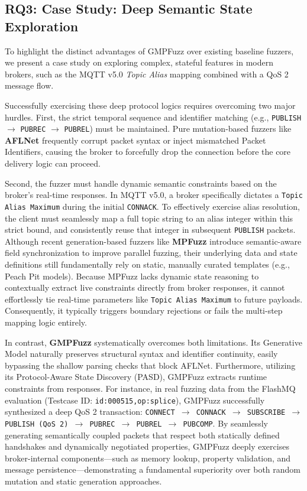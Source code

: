 \subsection{RQ3: Case Study: Deep Semantic State Exploration}
To highlight the distinct advantages of GMPFuzz over existing baseline fuzzers, we present a case study on exploring complex, stateful features in modern brokers, such as the MQTT v5.0 \textit{Topic Alias} mapping combined with a QoS 2 message flow.

Successfully exercising these deep protocol logics requires overcoming two major hurdles. First, the strict temporal sequence and identifier matching (e.g., \texttt{PUBLISH} $\rightarrow$ \texttt{PUBREC} $\rightarrow$ \texttt{PUBREL}) must be maintained. Pure mutation-based fuzzers like \textbf{AFLNet} frequently corrupt packet syntax or inject mismatched Packet Identifiers, causing the broker to forcefully drop the connection before the core delivery logic can proceed. 

Second, the fuzzer must handle dynamic semantic constraints based on the broker's real-time responses. In MQTT v5.0, a broker specifically dictates a \texttt{Topic Alias Maximum} during the initial \texttt{CONNACK}. To effectively exercise alias resolution, the client must seamlessly map a full topic string to an alias integer within this strict bound, and consistently reuse that integer in subsequent \texttt{PUBLISH} packets. Although recent generation-based fuzzers like \textbf{MPFuzz} introduce semantic-aware field synchronization to improve parallel fuzzing, their underlying data and state definitions still fundamentally rely on static, manually curated templates (e.g., Peach Pit models). Because MPFuzz lacks dynamic state reasoning to contextually extract live constraints directly from broker responses, it cannot effortlessly tie real-time parameters like \texttt{Topic Alias Maximum} to future payloads. Consequently, it typically triggers boundary rejections or fails the multi-step mapping logic entirely.

In contrast, \textbf{GMPFuzz} systematically overcomes both limitations. Its Generative Model naturally preserves structural syntax and identifier continuity, easily bypassing the shallow parsing checks that block AFLNet. Furthermore, utilizing its Protocol-Aware State Discovery (PASD), GMPFuzz extracts runtime constraints from responses. For instance, in real fuzzing data from the FlashMQ evaluation (Testcase ID: \texttt{id:000515,op:splice}), GMPFuzz successfully synthesized a deep QoS 2 transaction: \texttt{CONNECT $\rightarrow$ CONNACK $\rightarrow$ SUBSCRIBE $\rightarrow$ PUBLISH (QoS 2) $\rightarrow$ PUBREC $\rightarrow$ PUBREL $\rightarrow$ PUBCOMP}. By seamlessly generating semantically coupled packets that respect both statically defined handshakes and dynamically negotiated properties, GMPFuzz deeply exercises broker-internal components—such as memory lookup, property validation, and message persistence—demonstrating a fundamental superiority over both random mutation and static generation approaches.
